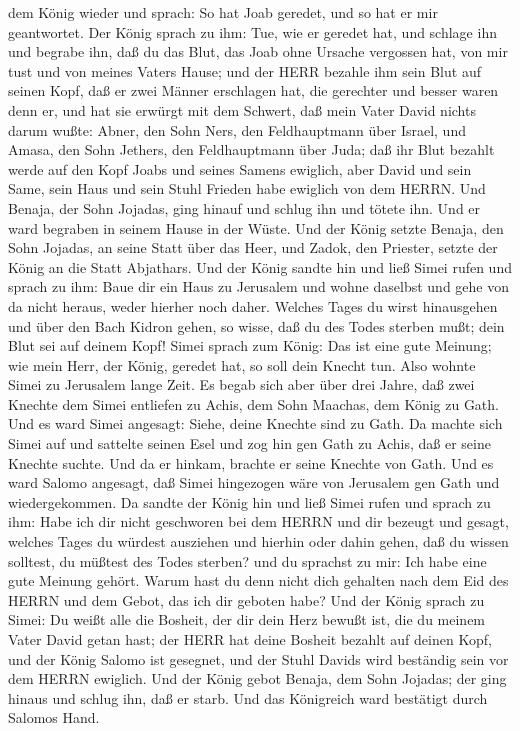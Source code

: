 dem König wieder und sprach: So hat Joab geredet, und so hat er mir
geantwortet.  Der König sprach zu ihm: Tue, wie er geredet
hat, und schlage ihn und begrabe ihn, daß du das Blut, das Joab ohne
Ursache vergossen hat, von mir tust und von meines Vaters Hause;
 und der HERR bezahle ihm sein Blut auf seinen Kopf, daß er
zwei Männer erschlagen hat, die gerechter und besser waren denn er, und
hat sie erwürgt mit dem Schwert, daß mein Vater David nichts darum
wußte: Abner, den Sohn Ners, den Feldhauptmann über Israel, und Amasa,
den Sohn Jethers, den Feldhauptmann über Juda;  daß ihr
Blut bezahlt werde auf den Kopf Joabs und seines Samens ewiglich, aber
David und sein Same, sein Haus und sein Stuhl Frieden habe ewiglich von
dem HERRN.  Und Benaja, der Sohn Jojadas, ging hinauf und
schlug ihn und tötete ihn. Und er ward begraben in seinem Hause in der
Wüste.  Und der König setzte Benaja, den Sohn Jojadas, an
seine Statt über das Heer, und Zadok, den Priester, setzte der König an
die Statt Abjathars.  Und der König sandte hin und ließ
Simei rufen und sprach zu ihm: Baue dir ein Haus zu Jerusalem und wohne
daselbst und gehe von da nicht heraus, weder hierher noch daher.
 Welches Tages du wirst hinausgehen und über den Bach
Kidron gehen, so wisse, daß du des Todes sterben mußt; dein Blut sei auf
deinem Kopf!  Simei sprach zum König: Das ist eine gute
Meinung; wie mein Herr, der König, geredet hat, so soll dein Knecht tun.
Also wohnte Simei zu Jerusalem lange Zeit.  Es begab sich
aber über drei Jahre, daß zwei Knechte dem Simei entliefen zu Achis, dem
Sohn Maachas, dem König zu Gath. Und es ward Simei angesagt: Siehe,
deine Knechte sind zu Gath.  Da machte sich Simei auf und
sattelte seinen Esel und zog hin gen Gath zu Achis, daß er seine Knechte
suchte. Und da er hinkam, brachte er seine Knechte von Gath.
 Und es ward Salomo angesagt, daß Simei hingezogen wäre von
Jerusalem gen Gath und wiedergekommen.  Da sandte der König
hin und ließ Simei rufen und sprach zu ihm: Habe ich dir nicht
geschworen bei dem HERRN und dir bezeugt und gesagt, welches Tages du
würdest ausziehen und hierhin oder dahin gehen, daß du wissen solltest,
du müßtest des Todes sterben? und du sprachst zu mir: Ich habe eine gute
Meinung gehört.  Warum hast du denn nicht dich gehalten
nach dem Eid des HERRN und dem Gebot, das ich dir geboten habe?
 Und der König sprach zu Simei: Du weißt alle die Bosheit,
der dir dein Herz bewußt ist, die du meinem Vater David getan hast; der
HERR hat deine Bosheit bezahlt auf deinen Kopf,  und der
König Salomo ist gesegnet, und der Stuhl Davids wird beständig sein vor
dem HERRN ewiglich.  Und der König gebot Benaja, dem Sohn
Jojadas; der ging hinaus und schlug ihn, daß er starb. Und das
Königreich ward bestätigt durch Salomos Hand.

